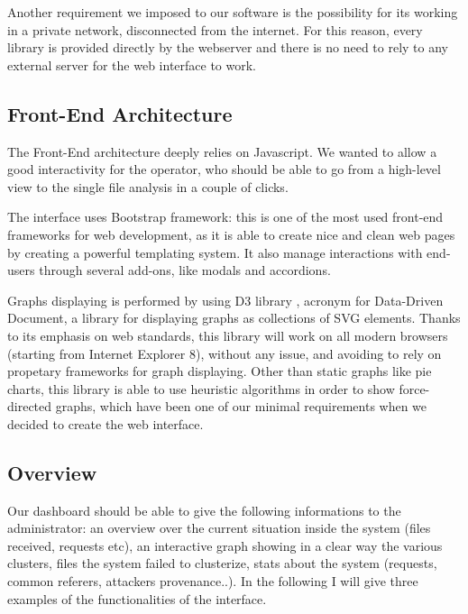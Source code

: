 Another requirement we imposed to our software is the possibility for its working in a private network, disconnected from the internet. For this reason, every library is provided directly by the webserver and there is no need to rely to any external server for the web interface to work.

\subsection{Front-End Architecture}

The Front-End architecture deeply relies on Javascript. We wanted to allow a good interactivity for the operator, who should be able to go from a high-level view to the single file analysis in a couple of clicks.

The interface uses Bootstrap \cite{bootstrap} framework: this is one of the most used front-end frameworks for web development, as it is able to create nice and clean web pages by creating a powerful templating system. It also manage interactions with end-users through several add-ons, like modals and accordions.

Graphs displaying is performed by using D3 library \cite{d3_home}, acronym for Data-Driven Document, a library for displaying graphs as collections of SVG elements. Thanks to its emphasis on web standards, this library will work on all modern browsers (starting from Internet Explorer 8), without any issue, and avoiding to rely on propetary frameworks for graph displaying. Other than static graphs like pie charts, this library is able to use heuristic algorithms in order  to show force-directed graphs, which have been one of our minimal requirements when we decided to create the web interface.

\subsection{Overview}

Our dashboard should be able to give the following informations to the administrator: an overview over the current situation inside the system (files received, requests etc), an interactive graph showing in a clear way the various clusters, files the system failed to clusterize, stats about the system (requests, common referers, attackers provenance..). In the following I will give three examples of the functionalities of the interface.

